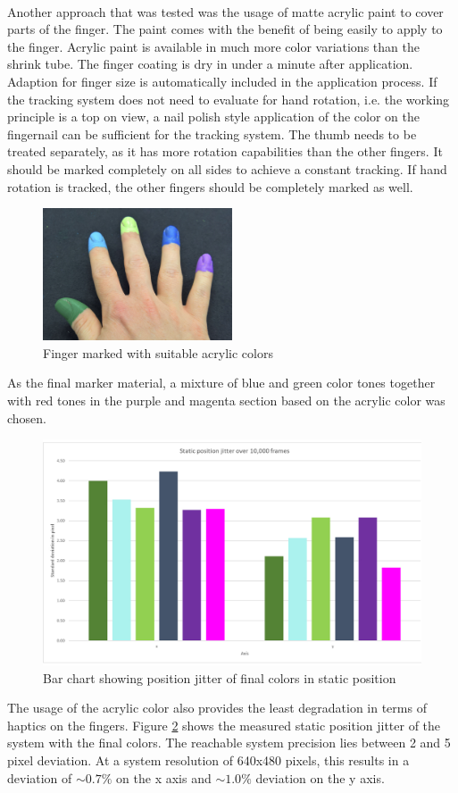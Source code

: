 \\Another approach that was tested was the usage of matte acrylic paint to cover parts of the finger. The paint comes with the benefit of being easily to apply to the finger. Acrylic paint is available in much more color variations than the shrink tube. The finger coating is dry in under a minute after application. Adaption for finger size is automatically included in the application process. If the tracking system does not need to evaluate for hand rotation, i.e. the working principle is a top on view, a nail polish style application of the color on the fingernail can be sufficient for the tracking system. The thumb needs to be treated separately, as it has more rotation capabilities than the other fingers. It should be marked completely on all sides to achieve a constant tracking. If hand rotation is tracked, the other fingers should be completely marked as well.
\begin{figure}[H]
\centering
\includegraphics[width=0.5\textwidth]{images/final_finger_markers.jpg}
\caption{Finger marked with suitable acrylic colors}
\label{img:final_markers}
\end{figure}
\newpage As the final marker material, a mixture of blue and green color tones together with red tones in the purple and magenta section based on the acrylic color was chosen.
\begin{figure}[H]
\centering
\includegraphics[width=\textwidth]{images/acrylic_color_jitter.jpg}
\caption{Bar chart showing position jitter of final colors in static position}
\label{img:color_jitter}
\end{figure}
 The usage of the acrylic color also provides the least degradation in terms of haptics on the fingers. Figure \ref{img:color_jitter} shows the measured static position jitter of the system with the final colors. The reachable system precision lies between 2 and 5 pixel deviation. At a system resolution of 640x480 pixels, this results in a deviation of $\sim 0.7\%$ on the x axis and $\sim 1.0\%$ deviation on the y axis.
 \newpage
